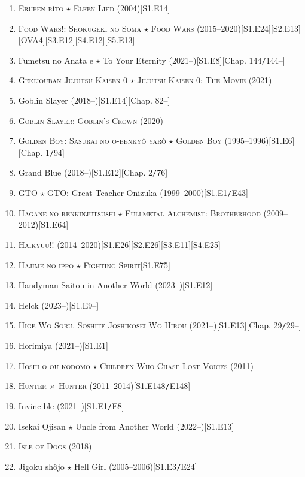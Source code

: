 \documentclass{article}
\begin{document}
\begin{enumerate}
    \item \textsc{Erufen r\^{\i}to $\star$ Elfen Lied} (2004)\hfill[S1.E14]
    \item \textsc{Food Wars!: Shokugeki no Soma $\star$ Food Wars} (2015--2020)\hfill[S1.E24][S2.E13][OVA4][S3.E12][S4.E12][S5.E13]
    \item Fumetsu no Anata e $\star$ To Your Eternity (2021--)\hfill[S1.E8][Chap. 144\texttt{/}144--]
    \item \textsc{Gekijouban Jujutsu Kaisen 0 $\star$ Jujutsu Kaisen 0: The Movie} (2021)
    \item Goblin Slayer (2018--)\hfill[S1.E14][Chap. 82--]
    \item \textsc{Goblin Slayer: Goblin's Crown} (2020)
    \item \textsc{Golden Boy: Sasurai no o-benky\^o yar\^o $\star$ Golden Boy} (1995--1996)\hfill[S1.E6][Chap. 1\texttt{/}94]
    \item Grand Blue (2018--)\hfill[S1.E12][Chap. 2\texttt{/}76]
    \item GTO $\star$ GTO: Great Teacher Onizuka (1999--2000)\hfill[S1.E1\texttt{/}E43]
    \item \textsc{Hagane no renkinjutsushi $\star$ Fullmetal Alchemist: Brotherhood} (2009--2012)\hfill[S1.E64]
    \item \textsc{Haikyuu!!} (2014--2020)\hfill[S1.E26][S2.E26][S3.E11][S4.E25]
    \item \textsc{Hajime no ippo $\star$ Fighting Spirit}\hfill[S1.E75]
    \item Handyman Saitou in Another World (2023--)\hfill[S1.E12]
    \item Helck (2023--)\hfill[S1.E9--]
    \item \textsc{Hige Wo Soru. Soshite Joshikosei Wo Hirou} (2021--)\hfill[S1.E13][Chap. 29\texttt{/}29--]
    \item Horimiya (2021--)\hfill[S1.E1]
    \item \textsc{Hoshi o ou kodomo $\star$ Children Who Chase Lost Voices} (2011)
    \item \textsc{Hunter $\times$ Hunter} (2011--2014)\hfill[S1.E148\texttt{/}E148]
    \item Invincible (2021--)\hfill[S1.E1\texttt{/}E8]
    \item Isekai Ojisan $\star$ Uncle from Another World (2022--)\hfill[S1.E13]
    \item \textsc{Isle of Dogs} (2018)
    \item Jigoku shôjo $\star$ Hell Girl (2005--2006)\hfill[S1.E3\texttt{/}E24]

\end{enumerate}
\end{document}
